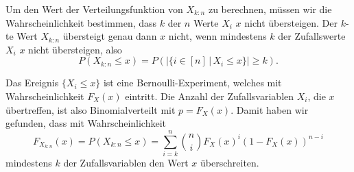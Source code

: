 Um den Wert der Verteilungsfunktion von $X_{k:n}$ zu berechnen, müssen wir 
die Wahrscheinlichkeit bestimmen, dass $k$ der $n$ Werte $X_i$ $x$ nicht
übersteigen.
Der $k$-te Wert $X_{k:n}$ übersteigt genau dann $x$ nicht, wenn
mindestens $k$ der Zufallswerte $X_i$ $x$ nicht übersteigen, also
\[
P(X_{k:n} \le x)
=
P\left(
|\{i\in[n]\,|\, X_i\le x\}| \ge k
\right).
\]

Das Ereignis $\{X_i\le x\}$ ist eine Bernoulli-Experiment, welches mit
Wahrscheinlichkeit $F_X(x)$ eintritt.
Die Anzahl der Zufallsvariablen $X_i$, die $x$ übertreffen, ist also
Binomialverteilt mit $p=F_X(x)$.
Damit haben wir gefunden, dass mit Wahrscheinlichkeit
\begin{equation}
F_{X_{k:n}}(x)
=
P(X_{k:n}\le x)
=
\sum_{i=k}^n \binom{n}{i}F_X(x)^i (1-F_X(x))^{n-i}
\label{buch:rekursion:ordnung:eqn:FXkn}
\end{equation}
mindestens $k$ der Zufallsvariablen den Wert $x$ überschreiten.

